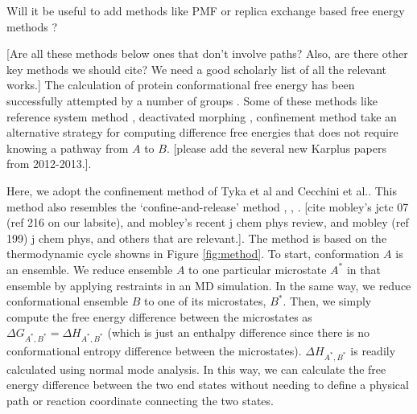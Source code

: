 \documentclass[12pt]{article}
\newcommand{\Arijit}[1]{\color{magenta}#1\normalcolor}
\newcommand{\Ken}[1]{\color{red}#1\normalcolor}
\begin{document}
\Arijit{Will it be useful to add methods like PMF or replica exchange based free energy methods ?}


\Ken{[Are all these methods below ones that don't involve paths?  Also, are there other key methods we should cite?  We need a good scholarly 
list of all the relevant works.]} 
The calculation of protein conformational free energy has been successfully attempted by a number of
groups \cite{Shell2010,Ytreberg2006,Zheng2008,Spichty2010,Strajbl2000,Park2008,Tyka2006,Cecchini2009,Ovchinnikov2013}. 
Some of these methods like reference system method \cite{Ytreberg2006}, deactivated morphing \cite{Park2008}, confinement 
method \cite{Tyka2006,Cecchini2009,Ovchinnikov2013} take an alternative strategy for computing difference free energies 
that does not require knowing a pathway from $A$ to $B$.  
\Ken{[please add the several new Karplus papers from 2012-2013.]}.

Here, we adopt the confinement method of Tyka et al \cite{Tyka2006} and Cecchini et al.\cite{Cecchini2009}. This method 
also resembles the `confine-and-release' method \cite{Mobley2007}, \cite{Mobley2012}, \cite{Mobley2006}.  
\Ken{[cite mobley's jctc 07 (ref 216 on our labsite), and mobley's recent j chem phys review, 
and mobley (ref 199) j chem phys, and others that are relevant.]}. The method is based on the thermodynamic cycle showns in 
Figure \ref{fig:method}.  To start, conformation $A$ is an ensemble.  We reduce ensemble $A$ to one particular microstate $A^\ast$ 
in that ensemble by applying restraints in an MD simulation.  In the same way, we reduce conformational ensemble $B$ to one of its 
microstates, $B^\ast$.  Then, we simply compute the free energy difference between the microstates 
as $\Delta G_{A^\ast, B^\ast} = \Delta H_{A^\ast, B^\ast}$ (which is just an enthalpy difference since there is no conformational 
entropy difference between the microstates).  $\Delta H_{A^\ast, B^\ast}$ is readily calculated using normal mode analysis. In 
this way, we can calculate the free energy difference between the two end states without needing to define a physical path or reaction 
coordinate connecting the two states.
\end{document}
